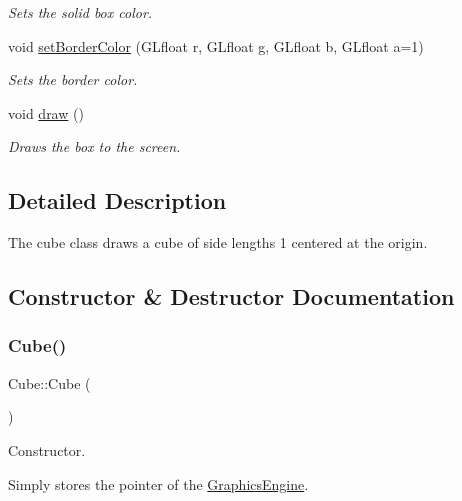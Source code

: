 \begin{DoxyCompactItemize}
\begin{DoxyCompactList}\small\item\em Sets the solid box color. \end{DoxyCompactList}\item 
void \hyperlink{class_cube_a30eb89f673d01f908328523377a2ba7d}{set\+Border\+Color} (G\+Lfloat r, G\+Lfloat g, G\+Lfloat b, G\+Lfloat a=1)
\begin{DoxyCompactList}\small\item\em Sets the border color. \end{DoxyCompactList}\item 
\mbox{\label{class_cube_ab26b72a81376fd5dc4fcc7f0b715b087}} 
void \hyperlink{class_cube_ab26b72a81376fd5dc4fcc7f0b715b087}{draw} ()
\begin{DoxyCompactList}\small\item\em Draws the box to the screen. \end{DoxyCompactList}\end{DoxyCompactItemize}


\subsection{Detailed Description}
The cube class draws a cube of side lengths 1 centered at the origin. 

\subsection{Constructor \& Destructor Documentation}
\mbox{\label{class_cube_a06f3d86fb63e3aad08623610aa3c17b4}} 
\subsubsection{\texorpdfstring{Cube()}{Cube()}}
{\footnotesize\ttfamily Cube\+::\+Cube (\begin{DoxyParamCaption}{ }\end{DoxyParamCaption})}



Constructor. 

Simply stores the pointer of the \hyperlink{class_graphics_engine}{Graphics\+Engine}. \mbox{\label{class_cube_aa814e979cecb8c451fdb332ded2cea1e}} 
